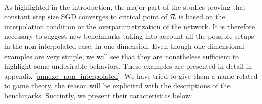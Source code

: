 ~~\\
As highlighted in the introduction, the major part of the studies proving that constant step size SGD converges to critical point of $\mathcal{R}$ is based on the interpolation condition or
the overparametrization of the network. It is therefore necessary to suggest new benchmarks taking
into account all the possible setups in the non-interpolated case, in one dimension. Even though one dimensional examples are very simple, we will see that they are nonetheless sufficient to highlight some undesirable behaviors.
These examples are presented in detail in appendix \ref{annexe_non_interpolated}. 
We have tried to give them a name related to game theory, the reason will be explicited with the descriptions of the benchmarks. 
Succintly, we present their caracteristics below:
